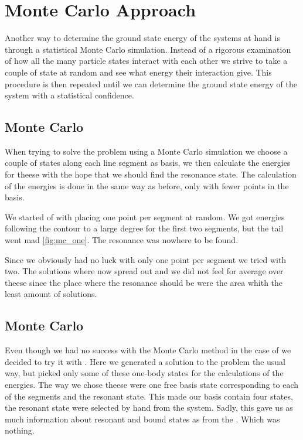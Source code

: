 \chapter{Monte Carlo Approach}
\label{cha:monte carlo}

Another way to determine the ground state energy of the systems at hand is through a statistical Monte Carlo simulation. 
Instead of a rigorous examination of how all the many particle states interact with each other we strive to take a couple of state at random and see what energy their interaction give. 
This procedure is then repeated until we can determine the ground state energy of the system with a statistical confidence.

\section{Monte Carlo }
When trying to solve the  problem using a Monte Carlo simulation we choose a couple of states along each line segment as basis, we then calculate the energies for theese with the hope that we should find the resonance state.
The calculation of the energies is done in the same way as before, only with fewer points in the basis.

We started of with placing one point per segment at random.
We got energies following the contour to a large degree for the first two segments, but the tail went mad \cref{fig:mc_one}.
The resonance was nowhere to be found.

Since we obviously had no luck with only one point per segment we tried with two.
The solutions where now spread out and we did not feel for average over theese since the place where the resonance should be were the area whith the least amount of solutions.

\section{Monte Carlo }
Even though we had no success with the Monte Carlo method in the case of  we decided to try it with .
Here we generated a solution to the  problem the usual way, but picked only some of these one-body states for the calculations of the energies.
The way we chose theese were one free basis state corresponding to each of the segments and the resonant state.
This made our basis contain four states, the resonant state were selected by hand from the  system.
Sadly, this gave us as much information about resonant and bound states as from the .
Which was nothing.

